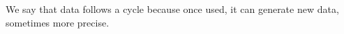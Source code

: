 We say that data follows a cycle because once used, it can generate new data, sometimes more precise.
